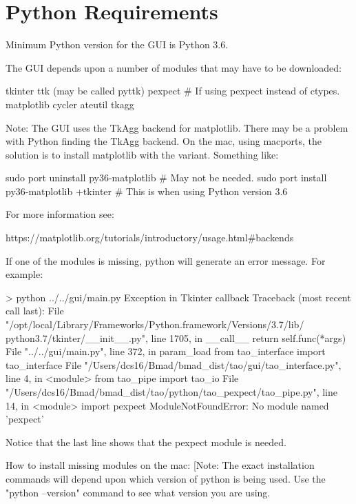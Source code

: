 \section{Python Requirements}

Minimum Python version for the GUI is Python 3.6.

The GUI depends upon a number of modules that may have to be downloaded:
\begin{example}
  tkinter
  ttk (may be called pyttk)
  pexpect         # If using pexpect instead of ctypes.
  matplotlib
  cycler
  ateutil
  tkagg
\end{example}
Note: The GUI uses the TkAgg backend for matplotlib. There may be a problem with Python finding the
TkAgg backend. On the mac, using macports, the solution is to install matplotlib with the
 variant. Something like:
\begin{example}
  sudo port uninstall py36-matplotlib           # May not be needed.
  sudo port install  py36-matplotlib +tkinter   # This is when using Python version 3.6
\end{example}
For more information see:
\begin{example}
  https://matplotlib.org/tutorials/introductory/usage.html#backends
\end{example}

If one of the modules is missing, python will generate an error message. For example:
\begin{example}
> python ../../gui/main.py
Exception in Tkinter callback
Traceback (most recent call last):
  File "/opt/local/Library/Frameworks/Python.framework/Versions/3.7/lib/
                            python3.7/tkinter/__init__.py", line 1705, in __call__
    return self.func(*args)
  File "../../gui/main.py", line 372, in param_load
    from tao_interface import tao_interface
  File "/Users/dcs16/Bmad/bmad_dist/tao/gui/tao_interface.py", line 4, in <module>
    from tao_pipe import tao_io
  File "/Users/dcs16/Bmad/bmad_dist/tao/python/tao_pexpect/tao_pipe.py", line 14, in <module>
    import pexpect
ModuleNotFoundError: No module named 'pexpect'
\end{example}
Notice that the last line shows that the pexpect module is needed.

How to install missing modules on the mac: [Note: The exact installation commands will depend upon
which version of python is being used. Use the "python --version" command to see what version you
are using.

